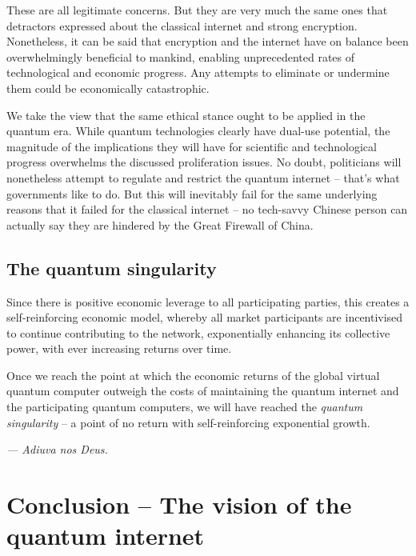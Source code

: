 \documentclass[aps,rmp,twocolumn,amsmath,amssymb,nofootinbib,superscriptaddress,longbibliography,floatfix,table-of-contents,eqsecnum]{revtex4-1}
\newcommand{\comment}[1]{{\color{blue}{\textbf{#1}}}}
\begin{document}

These are all legitimate concerns. But they are very much the same ones that detractors expressed about the classical internet and strong encryption. Nonetheless, it can be said that encryption and the internet have on balance been overwhelmingly beneficial to mankind, enabling unprecedented rates of technological and economic progress. Any attempts to eliminate or undermine them could be economically catastrophic.

We take the view that the same ethical stance ought to be applied in the quantum era. While quantum technologies clearly have dual-use potential, the magnitude of the implications they will have for scientific and technological progress overwhelms the discussed proliferation issues. No doubt, politicians will nonetheless attempt to regulate and restrict the quantum internet -- that's what governments like to do. But this will inevitably fail for the same underlying reasons that it failed for the classical internet -- no tech-savvy Chinese person can actually say they are hindered by the Great Firewall of China\texttrademark.

%
%

\subsection{The quantum singularity} \label{sec:singularity} 

Since there is positive economic leverage to all participating parties, this creates a self-reinforcing economic model, whereby all market participants are incentivised to continue contributing to the network, exponentially enhancing its collective power, with ever increasing returns over time.

Once we reach the point at which the economic returns of the global virtual quantum computer outweigh the costs of maintaining the quantum internet and the participating quantum computers, we will have reached the \textit{quantum singularity} -- a point of no return with self-reinforcing exponential growth.

\textit{--- Adiuva nos Deus.}

\comment{To do! talk about machine learning}

%
%

\section{Conclusion -- The vision of the quantum internet} \label{sec:vision_quant} 
\end{document}
